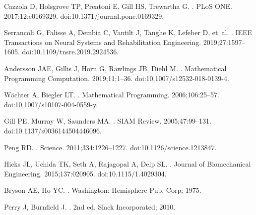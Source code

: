\documentclass[10pt,letterpaper]{article}
\begin{document}
\begin{thebibliography}{10}
    Cazzola D, Holsgrove TP, Preatoni E, Gill HS, Trewartha G.
    .
    \newblock PLoS ONE. 2017;12:e0169329.
    \newblock doi:{10.1371/journal.pone.0169329}.

    Serrancoli G, Falisse A, Dembia C, Vantilt J, Tanghe K, Lefeber D, et~al.
    .
    \newblock IEEE Transactions on Neural Systems and Rehabilitation Engineering.
    2019;27:1597--1605.
    \newblock doi:{10.1109/tnsre.2019.2924536}.

    Andersson JAE, Gillis J, Horn G, Rawlings JB, Diehl M.
    .
    \newblock Mathematical Programming Computation. 2019;11:1--36.
    \newblock doi:{10.1007/s12532-018-0139-4}.

    Wächter A, Biegler LT.
    .
    \newblock Mathematical Programming. 2006;106:25--57.
    \newblock doi:{10.1007/s10107-004-0559-y}.

    Gill PE, Murray W, Saunders MA.
    .
    \newblock SIAM Review. 2005;47:99--131.
    \newblock doi:{10.1137/s0036144504446096}.

    Peng RD.
    .
    \newblock Science. 2011;334:1226--1227.
    \newblock doi:{10.1126/science.1213847}.

    Hicks JL, Uchida TK, Seth A, Rajagopal A, Delp SL.
    .
    \newblock Journal of Biomechanical Engineering. 2015;137:020905.
    \newblock doi:{10.1115/1.4029304}.

    Bryson AE, Ho YC.
    .
    \newblock Washington: Hemisphere Pub. Corp; 1975.

    Perry J, Burnfield J.
    .
    \newblock 2nd ed. Slack Incorporated; 2010.


\end{thebibliography}
\end{document}
